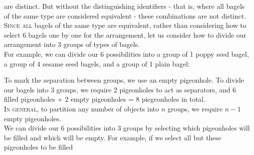 \documentclass{article}
\begin{document}
are distinct. But without the distinguishing identifiers - that is, where all bagels of the same type are considered equivalent - these combinations are not distinct.\\[1ex]
\textsc{Since all} bagels of the same type are equivalent, rather than considering how to select 6 bagels one by one for the arrangement, let us consider how to divide our arrangement into 3 groups of types of bagels.\\
For example, we can divide our 6 possibilities into a group of 1 poppy seed bagel, a group of 4 sesame seed bagels, and a group of 1 plain bagel:
\begin{center}
\end{center}
To mark the separation between groups, we use an empty pigeonhole. To divide our bagels into 3 groups, we require 2 pigeonholes to act as separators, and 6 filled pigeonholes + 2 empty pigeonholes = 8 piegeonholes in total.\\[1ex]
\textsc{In general,} to partition any number of objects into $n$ groups, we require $n-1$ empty pigeonholes.\\[1ex]
We can divide our 6 possibilities into 3 groups by selecting which pigeonholes will be filled and which will be empty. For example, if we select all but these pigeonholes to be filled
\begin{center}
\end{center}
\end{document}
